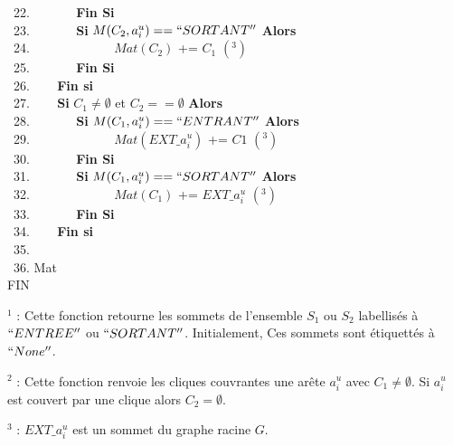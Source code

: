 \begin{algorithm}[!ht]
~22. \indent ~~~~~~  {\bf Fin Si} \\
~23. \indent ~~~~~~  {\bf Si}  $M(C_2, a_i^u) == ``SORTANT''$ {\bf Alors} \\
~24. \indent ~~~~~~~~~~~~ $Mat(C_2)$ += $C_1$ $(^3)$ \\  
~25. \indent ~~~~~~  {\bf Fin Si} \\
~26. \indent ~~~ {\bf Fin si} \\
~27. \indent ~~~ {\bf Si } $C_1 \neq \emptyset$ et $C_2 == \emptyset$ {\bf Alors} \\
~28. \indent ~~~~~~  {\bf Si}  $M(C_1, a_i^u) == ``ENTRANT''$ {\bf Alors} \\
~29. \indent ~~~~~~~~~~~~ $Mat(EXT\_a_i^u)$ += $C1$ $(^3)$\\  
~30. \indent ~~~~~~  {\bf Fin Si} \\
~31. \indent ~~~~~~  {\bf Si}  $M(C_1, a_i^u) == ``SORTANT''$ {\bf Alors} \\
~32. \indent ~~~~~~~~~~~~ $Mat(C_1)$ += $EXT\_a_i^u$ $(^3)$ \\  
~33. \indent ~~~~~~  {\bf Fin Si} \\
~34. \indent ~~~ {\bf Fin si} \\
~35.  \\
~36.  Mat\\
\noindent FIN\\
\end{algorithm}

\FloatBarrier
$^1$ : Cette fonction retourne les sommets de l'ensemble $S_1$ ou $S_2$ labellis\'es \`a $``ENTREE''$ ou $``SORTANT''$. Initialement, Ces sommets sont \'etiquett\'es \`a $``None''$.

$^2$ : Cette fonction renvoie les cliques couvrantes une ar\^ete $a_i^u$ avec $C_1 \ne \emptyset$. Si $a_i^u$ est couvert par une clique alors $C_2 = \emptyset$.

$^3$ : $EXT\_a_i^u$ est un sommet du graphe racine $G$.
\newline

